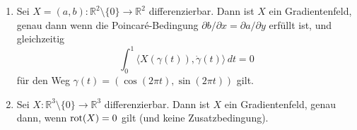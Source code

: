 \documentclass[../main.tex]{subfiles}
\begin{document}
\begin{proposition}\label{prop:low-dimensions}
  \leavevmode
  \begin{enumerate}[\normalfont(i)]
    \item Sei $X = (a, b) \colon \mathbb{R}^2 \setminus \{0\} \to \mathbb{R}^2$ 
      differenzierbar. Dann ist $X$ ein Gradientenfeld, genau dann wenn
      die Poincaré-Bedingung
      $\partial b / \partial x = \partial a / \partial y$ 
      erfüllt ist, und gleichzeitig
      \[
        \int_{0}^{1} \langle X(\gamma(t)), \dot \gamma(t) \rangle \, dt = 0
      \]
      für den Weg $\gamma(t) = (\cos(2\pi t), \sin(2 \pi t))$ gilt.
    \item Sei 
      $X \colon \mathbb{R}^3 \setminus \{0\} \to \mathbb{R}^3$ 
      differenzierbar.
      Dann ist $X$ ein Gradientenfeld, genau dann, wenn $\textup{rot}(X) = 0$
      gilt (und keine Zusatzbedingung).
  \end{enumerate}
\end{proposition}
\end{document}
